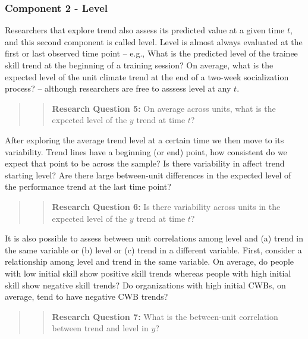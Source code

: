 \documentclass[english,,man]{apa6}
\theoremstyle{definition}
\theoremstyle{definition}
\theoremstyle{definition}
\theoremstyle{remark}
\begin{document}
\hypertarget{component-2---level}{%
\subsubsection{Component 2 - Level}\label{component-2---level}}

Researchers that explore trend also assess its predicted value at a
given time \(t\), and this second component is called level. Level is
almost always evaluated at the first or last observed time point --
e.g., What is the predicted level of the trainee skill trend at the
beginning of a training session? On average, what is the expected level
of the unit climate trend at the end of a two-week socialization
process? -- although researchers are free to asssess level at any \(t\).

\begin{quote}
\begin{quote}
\textbf{Research Question 5:} On average across units, what is the
expected level of the \(y\) trend at time \(t\)?
\end{quote}
\end{quote}

After exploring the average trend level at a certain time we then move
to its variability. Trend lines have a beginning (or end) point, how
consistent do we expect that point to be across the sample? Is there
variability in affect trend starting level? Are there large between-unit
differences in the expected level of the performance trend at the last
time point?

\begin{quote}
\begin{quote}
\textbf{Research Question 6:} Is there variability across units in the
expected level of the \(y\) trend at time \(t\)?
\end{quote}
\end{quote}

It is also possible to assess between unit correlations among level and
(a) trend in the same variable or (b) level or (c) trend in a different
variable. First, consider a relationship among level and trend in the
same variable. On average, do people with low initial skill show
positive skill trends whereas people with high initial skill show
negative skill trends? Do organizations with high initial CWBs, on
average, tend to have negative CWB trends?

\begin{quote}
\begin{quote}
\textbf{Research Question 7:} What is the between-unit correlation
between trend and level in \(y\)?
\end{quote}
\end{quote}
\end{document}
